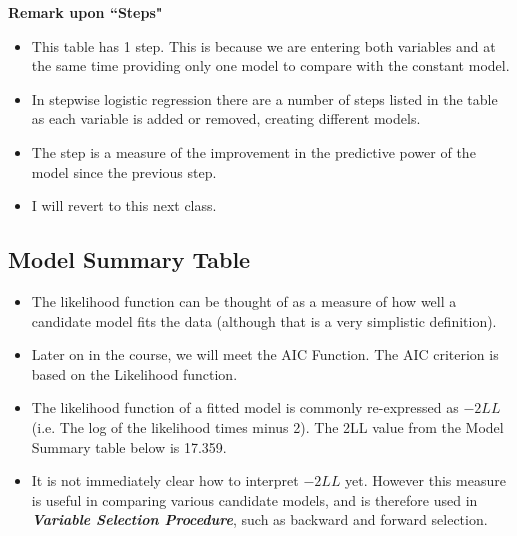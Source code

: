 \documentclass[a4paper,12pt]{article}
\begin{document}

\noindent \textbf{Remark upon ``Steps"}
\begin{itemize}
	\item This table has 1 step. This is because we are entering both variables and at the same
	time providing only one model to compare with the constant model. 
	\item In stepwise logistic regression there are a number of steps listed in the table as each variable is added or
	removed, creating different models. 
	\item The step is a measure of the improvement in the
	predictive power of the model since the previous step. 
	\item I will revert to this next class.
\end{itemize}

\subsection{Model Summary Table}

\begin{itemize}
	\item The likelihood function can be thought of as a measure of how well a candidate model fits the data (although that is a very simplistic definition). 
	\item Later on in the course, we will meet the AIC Function. The AIC criterion is based on the Likelihood function.
	\item The likelihood function of a fitted model is commonly re-expressed as $-2LL$ (i.e. The log of the likelihood times minus 2). The 2LL value from the Model Summary table below is 17.359.
	\item It is not immediately clear how to interpret $-2LL$ yet. However this measure is useful in comparing various candidate models, and is therefore used in \textbf{\textit{Variable Selection Procedure}}, such as backward and forward selection.
\end{itemize}
\end{document}
